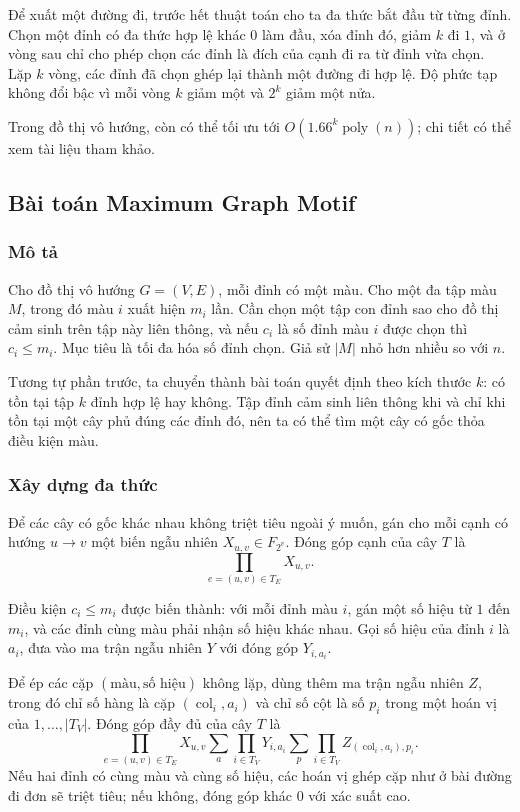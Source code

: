 \documentclass[11pt]{article}
\begin{document}
Để xuất một đường đi, trước hết thuật toán cho ta đa thức bắt đầu từ từng đỉnh.
Chọn một đỉnh có đa thức hợp lệ khác \(0\) làm đầu, xóa đỉnh đó, giảm \(k\) đi
\(1\), và ở vòng sau chỉ cho phép chọn các đỉnh là đích của cạnh đi ra từ đỉnh
vừa chọn. Lặp \(k\) vòng, các đỉnh đã chọn ghép lại thành một đường đi hợp lệ.
Độ phức tạp không đổi bậc vì mỗi vòng \(k\) giảm một và \(2^k\) giảm một nửa.

Trong đồ thị vô hướng, còn có thể tối ưu tới \(O(1.66^k\operatorname{poly}(n))\);
chi tiết có thể xem tài liệu tham khảo.

\subsection{Bài toán Maximum Graph Motif}

\subsubsection{Mô tả}

Cho đồ thị vô hướng \(G=(V,E)\), mỗi đỉnh có một màu. Cho một đa tập màu \(M\),
trong đó màu \(i\) xuất hiện \(m_i\) lần. Cần chọn một tập con đỉnh sao cho đồ
thị cảm sinh trên tập này liên thông, và nếu \(c_i\) là số đỉnh màu \(i\) được
chọn thì \(c_i\le m_i\). Mục tiêu là tối đa hóa số đỉnh chọn. Giả sử
\(|M|\) nhỏ hơn nhiều so với \(n\).

Tương tự phần trước, ta chuyển thành bài toán quyết định theo kích thước \(k\):
có tồn tại tập \(k\) đỉnh hợp lệ hay không. Tập đỉnh cảm sinh liên thông khi và
chỉ khi tồn tại một cây phủ đúng các đỉnh đó, nên ta có thể tìm một cây có gốc
thỏa điều kiện màu.

\subsubsection{Xây dựng đa thức}

Để các cây có gốc khác nhau không triệt tiêu ngoài ý muốn, gán cho mỗi cạnh có
hướng \(u\to v\) một biến ngẫu nhiên \(X_{u,v}\in F_{2^v}\). Đóng góp cạnh của
cây \(T\) là
\[
  \prod_{e=(u,v)\in T_E} X_{u,v}.
\]

Điều kiện \(c_i\le m_i\) được biến thành: với mỗi đỉnh màu \(i\), gán một số
hiệu từ \(1\) đến \(m_i\), và các đỉnh cùng màu phải nhận số hiệu khác nhau.
Gọi số hiệu của đỉnh \(i\) là \(a_i\), đưa vào ma trận ngẫu nhiên \(Y\) với
đóng góp \(Y_{i,a_i}\).

Để ép các cặp \((\text{màu},\text{số hiệu})\) không lặp, dùng thêm ma trận ngẫu
nhiên \(Z\), trong đó chỉ số hàng là cặp \((\operatorname{col}_i,a_i)\) và chỉ
số cột là số \(p_i\) trong một hoán vị của \(1,\ldots,|T_V|\). Đóng góp đầy đủ
của cây \(T\) là
\[
  \prod_{e=(u,v)\in T_E} X_{u,v}
  \sum_a \prod_{i\in T_V} Y_{i,a_i}
  \sum_p \prod_{i\in T_V} Z_{(\operatorname{col}_i,a_i),p_i}.
\]
Nếu hai đỉnh có cùng màu và cùng số hiệu, các hoán vị ghép cặp như ở bài đường
đi đơn sẽ triệt tiêu; nếu không, đóng góp khác \(0\) với xác suất cao.
\end{document}
